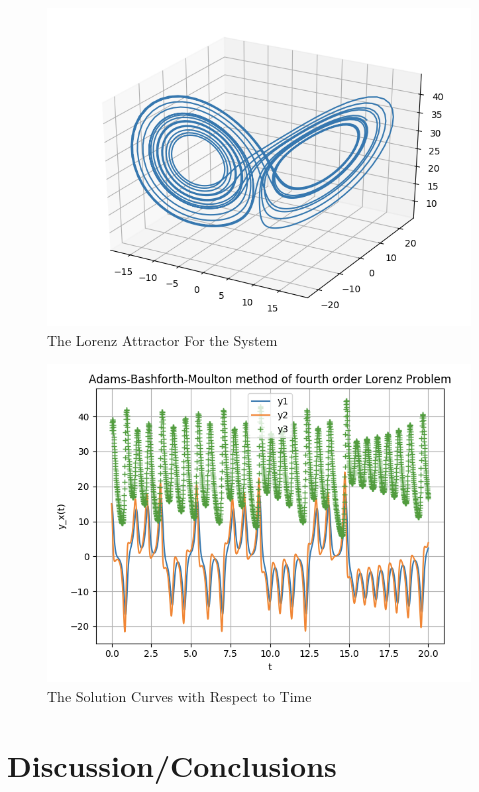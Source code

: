 \documentclass[11pt]{article}
\begin{document}
\begin{figure} [!h]
\centering
        \includegraphics[totalheight=8cm]{figure8.png}
    \caption{The Lorenz Attractor For the System}
    \label{figure17}
\end{figure}

\newpage

\begin{figure} [!h]
\centering
        \includegraphics[totalheight=8cm]{original.png}
    \caption{The Solution Curves with Respect to Time}
    \label{figure18}
\end{figure}

\section{Discussion/Conclusions}\label{S:5}
\end{document}
